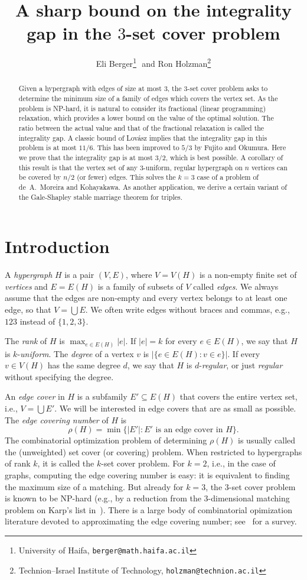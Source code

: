 \documentclass{article}
\title{A sharp bound on the integrality gap in the $3$-set cover problem}
\author{Eli Berger\thanks{University of Haifa, \texttt{berger@math.haifa.ac.il}}\,\, and Ron Holzman\thanks{Technion--Israel Institute of Technology, \texttt{holzman@technion.ac.il}}}
\date{}
\theoremstyle{definition}
\begin{document}
\maketitle

\begin{abstract}
Given a hypergraph with edges of size at most $3$, the $3$-set cover problem asks to determine the minimum size of a family of edges which covers the vertex set. As the problem is NP-hard, it is natural to consider its fractional (linear programming) relaxation, which provides a lower bound on the value of the optimal solution. The ratio between the actual value and that of the fractional relaxation is called the integrality gap. A classic bound of Lov\'asz implies that the integrality gap in this problem is at most $11/6$. This has been improved to $5/3$ by Fujito and Okumura. Here we prove that the integrality gap is at most $3/2$, which is best possible. A corollary of this result is that the vertex set of any $3$-uniform, regular hypergraph on $n$ vertices can be covered by $n/2$ (or fewer) edges. This solves the $k=3$ case of a problem of de~A.~Moreira and Kohayakawa. As another application, we derive a certain variant of the Gale-Shapley stable marriage theorem for triples.
\end{abstract}

\section{Introduction}
A \emph{hypergraph} $H$ is a pair $(V,E)$, where $V=V(H)$ is a non-empty finite set of \emph{vertices} and $E=E(H)$ is a family of subsets of $V$ called \emph{edges}. We always assume that the edges are non-empty and every vertex belongs to at least one edge, so that $V=\bigcup E$. We often write edges without braces and commas, e.g., $123$ instead of $\{1,2,3\}$.

The \emph{rank} of $H$ is $\max_{e \in E(H)} |e|$. If $|e|=k$ for every $e \in E(H)$, we say that $H$ is $k$-\emph{uniform}. The \emph{degree} of a vertex $v$ is $|\{e \in E(H): v \in e\}|$. If every $v \in V(H)$ has the same degree $d$, we say that $H$ is $d$-\emph{regular}, or just \emph{regular} without specifying the degree.

An \emph{edge cover} in $H$ is a subfamily $E' \subseteq E(H)$ that covers the entire vertex set, i.e., $V=\bigcup E'$. We will be interested in edge covers that are as small as possible. The \emph{edge covering number} of $H$ is \[ \rho(H) = \min \{|E'|: E' \textrm{ is an edge cover in } H\}.\] The combinatorial optimization problem of determining $\rho(H)$ is usually called the (unweighted) set cover (or covering) problem. When restricted to hypergraphs of rank $k$, it is called the $k$-set cover problem. For $k=2$, i.e., in the case of graphs, computing the edge covering number is easy: it is equivalent to finding the maximum size of a matching. But already for $k=3$, the $3$-set cover problem is known to be NP-hard (e.g., by a reduction from the $3$-dimensional matching problem on Karp's list in~\cite{Ka}). There is a large body of combinatorial opimization literature devoted to approximating the edge covering number; see~\cite{CTF} for a survey.
\end{document}
